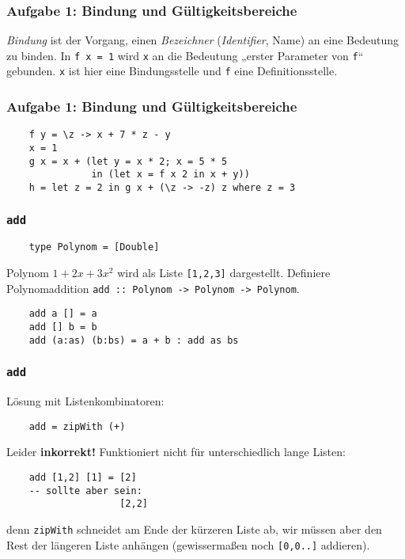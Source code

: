 \documentclass{beamer}
\date{2016-11-07/08}
\begin{document}
\normalsize
\normalem

\begin{frame}[plain]
  \titlepage
\end{frame}

\begin{frame}[fragile]
  \frametitle{Aufgabe 1: Bindung und Gültigkeitsbereiche}
  \emph{Bindung} ist der Vorgang, einen \emph{Bezeichner} (\emph{Identifier}, Name) an eine Bedeutung zu binden.
  In \lstinline{f x = 1} wird \lstinline{x} an die Bedeutung „erster Parameter von \lstinline{f}“ gebunden.
  \lstinline{x} ist hier eine Bindungsstelle und \lstinline{f} eine Definitionsstelle.
\end{frame}

\begin{frame}[fragile]
  \frametitle{Aufgabe 1: Bindung und Gültigkeitsbereiche}
  \begin{lstlisting}
    f y = \z -> x + 7 * z - y
    x = 1
    g x = x + (let y = x * 2; x = 5 * 5
               in (let x = f x 2 in x + y))
    h = let z = 2 in g x + (\z -> -z) z where z = 3
  \end{lstlisting}
\end{frame}

\begin{frame}[fragile]
  \frametitle{\lstinline{add}}
  \begin{lstlisting}
    type Polynom = [Double]
  \end{lstlisting}
  Polynom $1 + 2 x + 3 x^2$ wird als Liste \lstinline{[1,2,3]} dargestellt.
  Definiere Polynomaddition \lstinline{add :: Polynom -> Polynom -> Polynom}.
  \pause
  \begin{lstlisting}
    add a [] = a
    add [] b = b
    add (a:as) (b:bs) = a + b : add as bs
  \end{lstlisting}
\end{frame}

\begin{frame}[fragile]
  \frametitle{\texttt{add}}
  Lösung mit Listenkombinatoren:
  \begin{lstlisting}
    add = zipWith (+)
  \end{lstlisting}
  \pause
  Leider \textbf{inkorrekt!} Funktioniert nicht für unterschiedlich lange Listen:
  \begin{lstlisting}
    add [1,2] [1] = [2]
    -- sollte aber sein:
                    [2,2]
  \end{lstlisting}
  denn \lstinline{zipWith} schneidet am Ende der kürzeren Liste ab,
  wir müssen aber den Rest der längeren Liste anhängen (gewissermaßen noch \lstinline{[0,0..]} addieren).
\end{frame}
\end{document}
